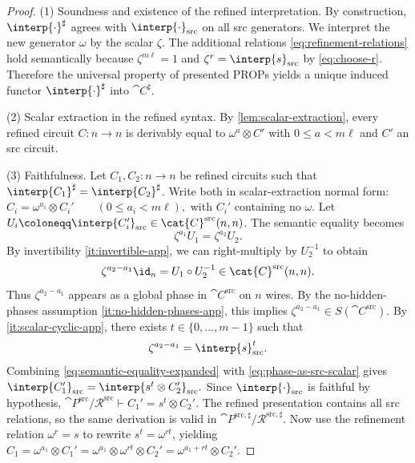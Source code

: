 \begin{proof}
(1) Soundness and existence of the refined interpretation.
By construction, $\interp{\cdot}^{\sharp}$ agrees with $\interp{\cdot}_{\mathrm{src}}$ on all src generators.
We interpret the new generator $\omega$ by the scalar $\zeta$.
The additional relations \eqref{eq:refinement-relations} hold semantically because
$\zeta^{m\ell}=1$ and $\zeta^{r}=\interp{s}_{\mathrm{src}}$ by \eqref{eq:choose-r}.
Therefore the universal property of presented PROPs yields a unique induced functor
$\interp{\cdot}^{\sharp}$ into $ \cat{C}^{\sharp}$.

(2) Scalar extraction in the refined syntax.
By \cref{lem:scalar-extraction}, every refined circuit $C:n\to n$ is derivably equal to
$\omega^{a}\otimes C'$ with $0\le a<m\ell$ and $C'$ an src circuit.

(3) Faithfulness.
Let $C_1,C_2:n\to n$ be refined circuits such that
$\interp{C_1}^{\sharp}=\interp{C_2}^{\sharp}$.
Write both in scalar-extraction normal form:
\(
  C_i = \omega^{a_i}\otimes C_i'
  \qquad (0\le a_i<m\ell),
\)
with $C_i'$ containing no $\omega$.
Let $U_i\coloneqq \interp{C_i'}_{\mathrm{src}}\in \cat{C}^{\mathrm{src}}(n,n)$.
The semantic equality becomes
\begin{equation}\label{eq:semantic-equality-expanded}
  \zeta^{a_1}   U_1 = \zeta^{a_2}  U_2.
\end{equation}
By invertibility \ref{it:invertible-app}, we can right-multiply by $U_2^{-1}$ to obtain
\begin{equation}\label{eq:phase-in-src-app}
  \zeta^{a_2-a_1} \id_n = U_1\circ U_2^{-1}
  \in  \cat{C}^{\mathrm{src}}(n,n).
\end{equation}
Thus $\zeta^{a_2-a_1}$ appears as a global phase in $ \cat{C}^{\mathrm{src}}$ on $n$ wires.
By the no-hidden-phases assumption \ref{it:no-hidden-phases-app}, this implies
\(
  \zeta^{a_2-a_1}\in S( \cat{C}^{\mathrm{src}}).
\)
By \ref{it:scalar-cyclic-app}, there exists $t\in\{0,\dots,m-1\}$ such that
\begin{equation}\label{eq:phase-as-src-scalar}
  \zeta^{a_2-a_1} = \interp{s}_{\mathrm{src}}^{ t}.
\end{equation}
Combining \eqref{eq:semantic-equality-expanded} with \eqref{eq:phase-as-src-scalar} gives
\(
  \interp{C_1'}_{\mathrm{src}}
  =
  \interp{s^{t}\otimes C_2'}_{\mathrm{src}}.
\)
Since $\interp{\cdot}_{\mathrm{src}}$ is faithful by hypothesis,
\(
  \cat{P}^{\mathrm{src}}/\mathcal{R}^{\mathrm{src}}
  \vdash
  C_1' = s^{t}\otimes C_2'.
\)
The refined presentation contains all src relations, so the same derivation is valid in
$\cat{P}^{\mathrm{src},\sharp}/\mathcal{R}^{\mathrm{src},\sharp}$.
Now use the refinement relation $\omega^{r}=s$ to rewrite $s^{t}=\omega^{rt}$, yielding
\(
  C_1
  =
  \omega^{a_1}\otimes C_1'
  =
  \omega^{a_1}\otimes \omega^{rt}\otimes C_2'
  =
  \omega^{a_1+rt}\otimes C_2'.
\)


\end{proof}
